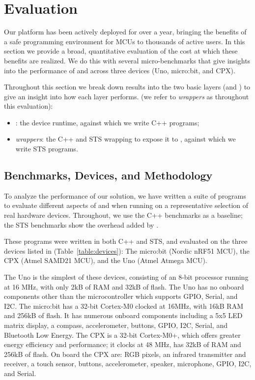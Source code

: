 \section{Evaluation}
\label{sec:evaluate}

Our platform has been actively deployed for over a year, bringing the benefits of
a safe programming environment for MCUs to thousands of active users.
In this section we provide a broad, quantitative evaluation of the cost at which
these benefits are realized. We do this with several micro-benchmarks that 
give insights into the performance of \MC and \CO across three devices
(Uno, micro:bit, and CPX).

Throughout this
section we break down results into the two basic layers (\CO and \MCN)
to give an insight into how each layer performs.
(we refer to \emph{\MC wrappers} as \MC throughout this evaluation):
\begin{itemize}
\item \emph{\CO}: the device runtime, against which we write C++ programs;
\item \emph{\MC wrappers}: the C++ and STS wrapping \CO
to expose it to \MC, against which we write STS programs.
\end{itemize}

\subsection{Benchmarks, Devices, and Methodology}

To analyze the performance of our solution, we have written a suite of programs to evaluate
different aspects of \MC and \CO when running on a representative selection of real hardware devices.
Throughout, we use the C++ \CO benchmarks as a baseline; 
the STS benchmarks show the overhead added by \MC.

These programs were written in both C++ and STS, and evaluated on the three 
devices listed in (Table~\ref{table:devices}): The micro:bit (Nordic nRF51 MCU), 
the CPX (Atmel SAMD21 MCU), and the Uno (Atmel Atmega MCU).

The Uno is the simplest of these devices, 
consisting of an 8-bit processor running at 16 MHz,
with only 2kB of RAM and 32kB of flash.
The Uno has no onboard components other than the microcontroller which supports
GPIO, Serial, and I2C.
The micro:bit has a 32-bit Cortex-M0 clocked at 16MHz, with 16kB RAM and 256kB of flash. It has numerous onboard components
including a 5x5 LED matrix display, a compass, accelerometer, buttons, GPIO, I2C, Serial, and Bluetooth Low Energy.
The CPX is a 32-bit Cortex-M0+, which offers greater energy efficiency and performance; it clocks at 48 MHz, has 32kB of RAM and
256kB of flash. On board the CPX are: RGB pixels, an infrared transmitter and receiver, a touch sensor, buttons, accelerometer, speaker,
microphone, GPIO, I2C, and Serial.

